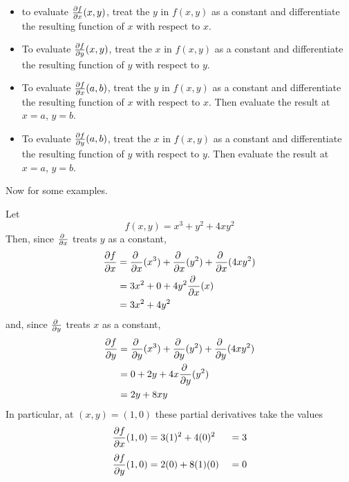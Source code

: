 \begin{itemize}
\item
to evaluate $\pdiff{f}{x}(x,y)$, treat the $y$ in $f(x,y)$ as a constant
and differentiate the resulting function of $x$ with respect to $x$.
\item
To evaluate $\pdiff{f}{y}(x,y)$, treat the $x$ in $f(x,y)$ as a constant
and differentiate the resulting function of $y$ with respect to $y$.
\item
To evaluate $\pdiff{f}{x}(a,b)$, treat the $y$ in $f(x,y)$ as a constant
and differentiate the resulting function of $x$ with respect to $x$.
Then evaluate the result at $x=a$, $y=b$.
\item
To evaluate $\pdiff{f}{y}(a,b)$, treat the $x$ in $f(x,y)$ as a constant
and differentiate the resulting function of $y$ with respect to $y$.
Then evaluate the result at $x=a$, $y=b$.
\end{itemize}
\noindent
Now for some examples.

\begin{eg}\label{eg partials A}
Let
\begin{equation*}
f(x,y) = x^3+y^2+ 4xy^2 
\end{equation*}
Then, since $\pdiff{}{x}$ treats $y$ as a constant,
\begin{align*}
\pdiff{f}{x}%
&= \pdiff{}{x}(x^3) + \pdiff{}{x}(y^2) +\pdiff{}{x}(4xy^2) \\
&= 3x^2+0 + 4y^2\pdiff{}{x}(x) \\
&= 3x^2 +4y^2 
\end{align*}
and, since $\pdiff{}{y}$ treats $x$ as a constant,
\begin{align*}
\pdiff{f}{y}%
&= \pdiff{}{y}(x^3) + \pdiff{}{y}(y^2) +\pdiff{}{y}(4xy^2) \\
&= 0 + 2y + 4x\pdiff{}{y}(y^2) \\
&= 2y+8xy
\end{align*}
In particular, at $(x,y)=(1,0)$ these partial derivatives take the values 
\begin{alignat*}{3}
\pdiff{f}{x}(1,0) &= 3(1)^2 +4(0)^2&=3 \\[0.05in]
\pdiff{f}{y}(1,0) &= 2(0) +8(1)(0)\ &=0 
\end{alignat*}
\end{eg}\goodbreak

